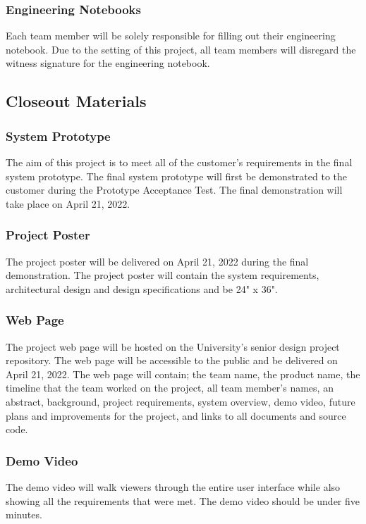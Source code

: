 \subsubsection{Engineering Notebooks}
Each team member will be solely responsible for filling out their engineering notebook. Due to the setting of this project, all team members will disregard the witness signature for the engineering notebook.

\subsection{Closeout Materials}
\subsubsection{System Prototype}
The aim of this project is to meet all of the customer's requirements in the final system prototype. The final system prototype will first be demonstrated to the customer during the Prototype Acceptance Test. The final demonstration will take place on April 21, 2022.

\subsubsection{Project Poster}
The project poster will be delivered on April 21, 2022 during the final demonstration. The project poster will contain the system requirements, architectural design and design specifications and be 24" x 36". 

\subsubsection{Web Page}
The project web page will be hosted on the University's senior design project repository. The web page will be accessible to the public and be delivered on April 21, 2022. The web page will contain; the team name, the product name, the timeline that the team worked on the project, all team member's names, an abstract, background, project requirements, system overview, demo video, future plans and improvements for the project, and links to all documents and source code. 

\subsubsection{Demo Video}
The demo video will walk viewers through the entire user interface while also showing all the requirements that were met. The demo video should be under five minutes.

